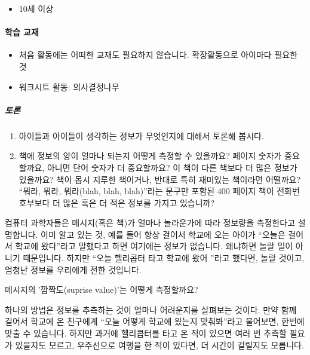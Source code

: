 \documentclass[]{article}
\begin{document}
\begin{itemize}
\itemsep1pt\parskip0pt
\item
  10세 이상
\end{itemize}

\mbox{}\paragraph{학습 교재}\label{section-77}

\begin{itemize}
\itemsep1pt\parskip0pt
\item
  처음 활동에는 어떠한 교재도 필요하지 않습니다. 확장활동으로 아이마다
  필요한 것
\item
  워크시트 활동: 의사결정나무
\end{itemize}


\subparagraph{토론}\label{section-78}

\begin{enumerate}
\item
  아이들과 아이들이 생각하는 정보가 무엇인지에 대해서 토론해 봅시다.
\item
  책에 정보의 양이 얼마나 되는지 어떻게 측정할 수 있을까요? 페이지
  숫자가 중요할까요, 아니면 단어 숫자가 더 중요할까요? 이 책이 다른
  책보다 더 많은 정보가 있을까요? 책이 몹시 지루한 책이거나, 반대로 특히
  재미있는 책이라면 어떨까요? ``뭐라, 뭐라, 뭐라(blah, blah, blah)''라는
  문구만 포함된 400 페이지 책이 전화번호부보다 더 많은 혹은 더 적은
  정보를 가지고 있습니까?
\end{enumerate}

컴퓨터 과학자들은 메시지(혹은 책)가 얼마나 놀라운가에 따라 정보량을
측정한다고 설명합니다. 이미 알고 있는 것, 예를 들어 항상 걸어서 학교에
오는 아이가 ``오늘은 걸어서 학교에 왔다''라고 말했다고 하면 여기에는
정보가 없습니다. 왜냐하면 놀랄 일이 아니기 때문입니다. 하지만 ``오늘
헬리콥터 타고 학교에 왔어 ''라고 했다면, 놀랄 것이고, 엄청난 정보를
우리에게 전한 것입니다.

메시지의 '깜짝도(suprise value)'는 어떻게 측정할까요?

하나의 방법은 정보를 추측하는 것이 얼마나 어려운지를 살펴보는 것이다.
만약 함께 걸어서 학교에 온 친구에게 ``오늘 어떻게 학교에 왔는지
맞춰봐''라고 물어보면, 한번에 맞출 수 있습니다. 하지만 과거에 헬리콥터를
타고 온 적이 있으면 여러 번 추측할 필요가 있을지도 모르고, 우주선으로
여행을 한 적이 있다면, 더 시간이 걸릴지도 모릅니다.
\end{document}
